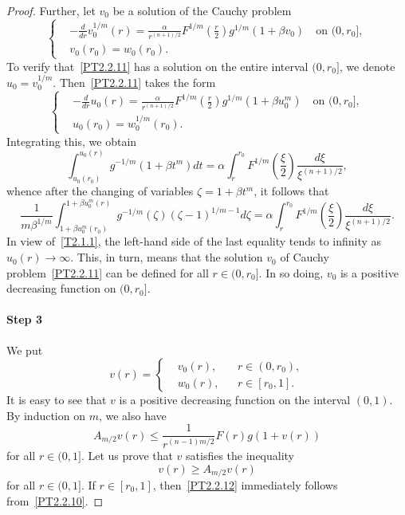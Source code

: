 \documentclass[11pt]{amsart}
\theoremstyle{definition}
\numberwithin{equation}{section}
\begin{document}
\begin{proof}
Further, let $v_0$ be a solution of the Cauchy problem
\begin{equation}
	\left\{
		\begin{aligned}
			&
			- \frac{
				d
			}{
				d r
			}
			v_0^{1 / m} (r)
			=
			\frac{
				\alpha
			}{
				r^{(n + 1) / 2}
			}
			F^{1 / m} 
			\left(
				\frac{r}{2}
			\right)
			g^{1 / m} (1 + \beta v_0)
			\quad
			\mbox{on } (0, r_0],
			\\
			&
			v_0 (r_0) = w_0 (r_0).
		\end{aligned}
	\right.
	\label{PT2.2.11}
\end{equation}
To verify that~\eqref{PT2.2.11} has a solution on the entire interval $(0, r_0]$, we denote $u_0 = v_0^{1 / m}$. Then~\eqref{PT2.2.11} takes the form
$$
	\left\{
		\begin{aligned}
			&
			- \frac{
			d
			}{
				d r
			}
			u_0 (r)
			=
			\frac{
				\alpha
			}{
				r^{(n + 1) / 2}
			}
			F^{1 / m}
			\left(
				\frac{r}{2}
			\right)
			g^{1 / m} (1 + \beta u_0^m)
			\quad
			\mbox{on } (0, r_0],
			\\
			&
			u_0 (r_0) = w_0^{1 / m} (r_0).
		\end{aligned}
	\right.
$$
Integrating this, we obtain
$$
	\int_{
		u_0 (r_0)
	}^{
		u_0 (r)
	}
	g^{- 1 / m} (1 + \beta t^m)
	d t
	=
	\alpha
	\int_r^{r_0}
	F^{1 / m}
	\left(
		\frac{\xi}{2}
	\right)
	\frac{
		d\xi
	}{
		\xi^{(n + 1) / 2}
	},
$$
whence after the changing of variables $\zeta = 1 + \beta t^m$, it follows that
$$
	\frac{
		1
	}{
		m \beta^{1 / m}
	}
	\int_{
		1 + \beta u_0^m (r_0)
	}^{
		1 + \beta u_0^m (r)
	}
	g^{- 1 / m} (\zeta)
	(\zeta - 1)^{1 / m - 1}
	d \zeta
	=
	\alpha
	\int_r^{r_0}
	F^{1 / m}
	\left(
		\frac{\xi}{2}
	\right)
	\frac{
		d\xi
	}{
		\xi^{(n + 1) / 2}
	}.
$$
In view of~\eqref{T2.1.1}, the left-hand side of the last equality tends to infinity as $u_0 (r) \to \infty$. This, in turn, means that the solution $v_0$ of Cauchy problem~\eqref{PT2.2.11} can be defined for all $r \in (0, r_0]$.
In so doing, $v_0$ is a positive decreasing function on $(0, r_0]$.

\paragraph{Step 3}
We put
$$
	v (r)
	=
	\left\{
		\begin{aligned}
			&
			v_0 (r),
			&&
			r \in (0, r_0),
			\\
			&
			w_0 (r),
			&&
			r \in [r_0, 1].
		\end{aligned}
	\right.
$$
It is easy to see that $v$ is a positive decreasing function on the interval $(0, 1)$. By induction on $m$, we also have
\begin{equation}
	A_{m/2} v (r)
	\le
	\frac{
		1
	}{
		r^{(n - 1) m / 2}
	}
	F (r) 
	g (1 + v (r))
	\label{PT2.2.13}
\end{equation}
for all $r \in (0, 1]$.
Let us prove that $v$ satisfies the inequality
\begin{equation}
	v (r)
	\ge
	A_{m/2} v (r)
	\label{PT2.2.12}
\end{equation}
for all $r \in (0, 1]$.
If $r \in [r_0, 1]$, then~\eqref{PT2.2.12} immediately follows from~\eqref{PT2.2.10}.


\end{proof}
\end{document}
